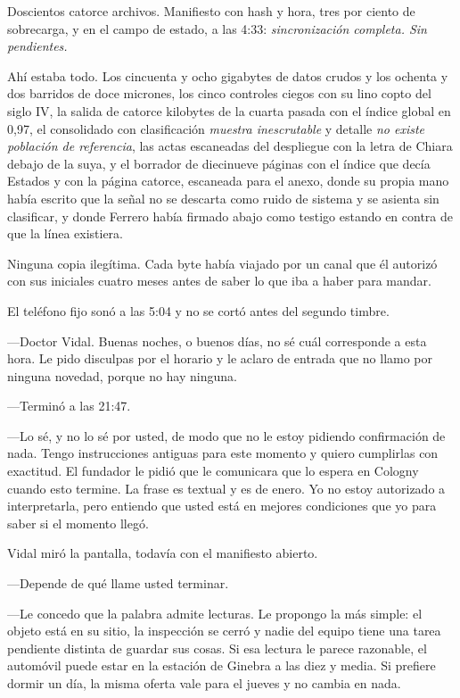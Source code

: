 Doscientos catorce archivos. Manifiesto con hash y hora, tres por ciento de sobrecarga, y en el campo de estado, a las 4:33: \textit{sincronización completa. Sin pendientes.}

Ahí estaba todo. Los cincuenta y ocho gigabytes de datos crudos y los ochenta y dos barridos de doce micrones, los cinco controles ciegos con su lino copto del siglo IV, la salida de catorce kilobytes de la cuarta pasada con el índice global en 0,97, el consolidado con clasificación \textit{muestra inescrutable} y detalle \textit{no existe población de referencia}, las actas escaneadas del despliegue con la letra de Chiara debajo de la suya, y el borrador de diecinueve páginas con el índice que decía Estados y con la página catorce, escaneada para el anexo, donde su propia mano había escrito que la señal no se descarta como ruido de sistema y se asienta sin clasificar, y donde Ferrero había firmado abajo como testigo estando en contra de que la línea existiera.

Ninguna copia ilegítima. Cada byte había viajado por un canal que él autorizó con sus iniciales cuatro meses antes de saber lo que iba a haber para mandar.

El teléfono fijo sonó a las 5:04 y no se cortó antes del segundo timbre.

---Doctor Vidal. Buenas noches, o buenos días, no sé cuál corresponde a esta hora. Le pido disculpas por el horario y le aclaro de entrada que no llamo por ninguna novedad, porque no hay ninguna.

---Terminó a las 21:47.

---Lo sé, y no lo sé por usted, de modo que no le estoy pidiendo confirmación de nada. Tengo instrucciones antiguas para este momento y quiero cumplirlas con exactitud. El fundador le pidió que le comunicara que lo espera en Cologny cuando esto termine. La frase es textual y es de enero. Yo no estoy autorizado a interpretarla, pero entiendo que usted está en mejores condiciones que yo para saber si el momento llegó.

Vidal miró la pantalla, todavía con el manifiesto abierto.

---Depende de qué llame usted terminar.

---Le concedo que la palabra admite lecturas. Le propongo la más simple: el objeto está en su sitio, la inspección se cerró y nadie del equipo tiene una tarea pendiente distinta de guardar sus cosas. Si esa lectura le parece razonable, el automóvil puede estar en la estación de Ginebra a las diez y media. Si prefiere dormir un día, la misma oferta vale para el jueves y no cambia en nada.

